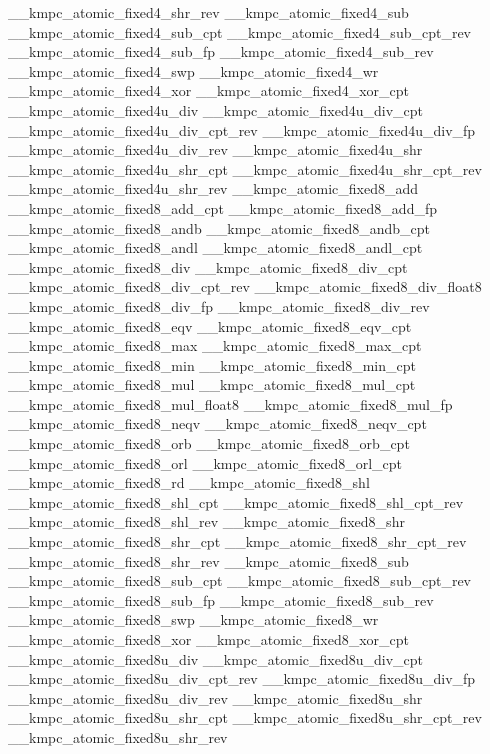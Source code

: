 \begin{DoxyCode}
\_\_kmpc\_atomic\_fixed4\_shr\_rev
\_\_kmpc\_atomic\_fixed4\_sub
\_\_kmpc\_atomic\_fixed4\_sub\_cpt
\_\_kmpc\_atomic\_fixed4\_sub\_cpt\_rev
\_\_kmpc\_atomic\_fixed4\_sub\_fp
\_\_kmpc\_atomic\_fixed4\_sub\_rev
\_\_kmpc\_atomic\_fixed4\_swp
\_\_kmpc\_atomic\_fixed4\_wr
\_\_kmpc\_atomic\_fixed4\_xor
\_\_kmpc\_atomic\_fixed4\_xor\_cpt
\_\_kmpc\_atomic\_fixed4u\_div
\_\_kmpc\_atomic\_fixed4u\_div\_cpt
\_\_kmpc\_atomic\_fixed4u\_div\_cpt\_rev
\_\_kmpc\_atomic\_fixed4u\_div\_fp
\_\_kmpc\_atomic\_fixed4u\_div\_rev
\_\_kmpc\_atomic\_fixed4u\_shr
\_\_kmpc\_atomic\_fixed4u\_shr\_cpt
\_\_kmpc\_atomic\_fixed4u\_shr\_cpt\_rev
\_\_kmpc\_atomic\_fixed4u\_shr\_rev
\_\_kmpc\_atomic\_fixed8\_add
\_\_kmpc\_atomic\_fixed8\_add\_cpt
\_\_kmpc\_atomic\_fixed8\_add\_fp
\_\_kmpc\_atomic\_fixed8\_andb
\_\_kmpc\_atomic\_fixed8\_andb\_cpt
\_\_kmpc\_atomic\_fixed8\_andl
\_\_kmpc\_atomic\_fixed8\_andl\_cpt
\_\_kmpc\_atomic\_fixed8\_div
\_\_kmpc\_atomic\_fixed8\_div\_cpt
\_\_kmpc\_atomic\_fixed8\_div\_cpt\_rev
\_\_kmpc\_atomic\_fixed8\_div\_float8
\_\_kmpc\_atomic\_fixed8\_div\_fp
\_\_kmpc\_atomic\_fixed8\_div\_rev
\_\_kmpc\_atomic\_fixed8\_eqv
\_\_kmpc\_atomic\_fixed8\_eqv\_cpt
\_\_kmpc\_atomic\_fixed8\_max
\_\_kmpc\_atomic\_fixed8\_max\_cpt
\_\_kmpc\_atomic\_fixed8\_min
\_\_kmpc\_atomic\_fixed8\_min\_cpt
\_\_kmpc\_atomic\_fixed8\_mul
\_\_kmpc\_atomic\_fixed8\_mul\_cpt
\_\_kmpc\_atomic\_fixed8\_mul\_float8
\_\_kmpc\_atomic\_fixed8\_mul\_fp
\_\_kmpc\_atomic\_fixed8\_neqv
\_\_kmpc\_atomic\_fixed8\_neqv\_cpt
\_\_kmpc\_atomic\_fixed8\_orb
\_\_kmpc\_atomic\_fixed8\_orb\_cpt
\_\_kmpc\_atomic\_fixed8\_orl
\_\_kmpc\_atomic\_fixed8\_orl\_cpt
\_\_kmpc\_atomic\_fixed8\_rd
\_\_kmpc\_atomic\_fixed8\_shl
\_\_kmpc\_atomic\_fixed8\_shl\_cpt
\_\_kmpc\_atomic\_fixed8\_shl\_cpt\_rev
\_\_kmpc\_atomic\_fixed8\_shl\_rev
\_\_kmpc\_atomic\_fixed8\_shr
\_\_kmpc\_atomic\_fixed8\_shr\_cpt
\_\_kmpc\_atomic\_fixed8\_shr\_cpt\_rev
\_\_kmpc\_atomic\_fixed8\_shr\_rev
\_\_kmpc\_atomic\_fixed8\_sub
\_\_kmpc\_atomic\_fixed8\_sub\_cpt
\_\_kmpc\_atomic\_fixed8\_sub\_cpt\_rev
\_\_kmpc\_atomic\_fixed8\_sub\_fp
\_\_kmpc\_atomic\_fixed8\_sub\_rev
\_\_kmpc\_atomic\_fixed8\_swp
\_\_kmpc\_atomic\_fixed8\_wr
\_\_kmpc\_atomic\_fixed8\_xor
\_\_kmpc\_atomic\_fixed8\_xor\_cpt
\_\_kmpc\_atomic\_fixed8u\_div
\_\_kmpc\_atomic\_fixed8u\_div\_cpt
\_\_kmpc\_atomic\_fixed8u\_div\_cpt\_rev
\_\_kmpc\_atomic\_fixed8u\_div\_fp
\_\_kmpc\_atomic\_fixed8u\_div\_rev
\_\_kmpc\_atomic\_fixed8u\_shr
\_\_kmpc\_atomic\_fixed8u\_shr\_cpt
\_\_kmpc\_atomic\_fixed8u\_shr\_cpt\_rev
\_\_kmpc\_atomic\_fixed8u\_shr\_rev
\end{DoxyCode}


